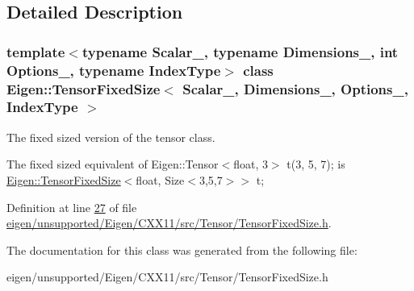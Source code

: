 \subsection{Detailed Description}
\subsubsection*{template$<$typename Scalar\+\_\+, typename Dimensions\+\_\+, int Options\+\_\+, typename Index\+Type$>$\newline
class Eigen\+::\+Tensor\+Fixed\+Size$<$ Scalar\+\_\+, Dimensions\+\_\+, Options\+\_\+, Index\+Type $>$}

The fixed sized version of the tensor class. 

The fixed sized equivalent of Eigen\+::\+Tensor$<$float, 3$>$ t(3, 5, 7); is \hyperlink{class_eigen_1_1_tensor_fixed_size}{Eigen\+::\+Tensor\+Fixed\+Size}$<$float, Size$<$3,5,7$>$$>$ t; 

Definition at line \hyperlink{eigen_2unsupported_2_eigen_2_c_x_x11_2src_2_tensor_2_tensor_fixed_size_8h_source_l00027}{27} of file \hyperlink{eigen_2unsupported_2_eigen_2_c_x_x11_2src_2_tensor_2_tensor_fixed_size_8h_source}{eigen/unsupported/\+Eigen/\+C\+X\+X11/src/\+Tensor/\+Tensor\+Fixed\+Size.\+h}.



The documentation for this class was generated from the following file\+:\begin{DoxyCompactItemize}
\item 
eigen/unsupported/\+Eigen/\+C\+X\+X11/src/\+Tensor/\+Tensor\+Fixed\+Size.\+h\end{DoxyCompactItemize}

